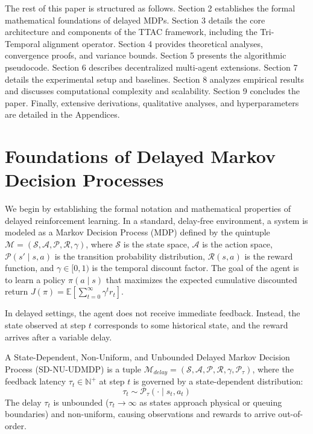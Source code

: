 \documentclass[manuscript, screen, review]{jair}
\begin{document}
The rest of this paper is structured as follows. Section 2 establishes the formal mathematical foundations of delayed MDPs. Section 3 details the core architecture and components of the TTAC framework, including the Tri-Temporal alignment operator. Section 4 provides theoretical analyses, convergence proofs, and variance bounds. Section 5 presents the algorithmic pseudocode. Section 6 describes decentralized multi-agent extensions. Section 7 details the experimental setup and baselines. Section 8 analyzes empirical results and discusses computational complexity and scalability. Section 9 concludes the paper. Finally, extensive derivations, qualitative analyses, and hyperparameters are detailed in the Appendices.

\section{Foundations of Delayed Markov Decision Processes}
We begin by establishing the formal notation and mathematical properties of delayed reinforcement learning. In a standard, delay-free environment, a system is modeled as a Markov Decision Process (MDP) defined by the quintuple $\mathcal{M} = (\mathcal{S}, \mathcal{A}, \mathcal{P}, \mathcal{R}, \gamma)$, where $\mathcal{S}$ is the state space, $\mathcal{A}$ is the action space, $\mathcal{P}(s' \mid s, a)$ is the transition probability distribution, $\mathcal{R}(s, a)$ is the reward function, and $\gamma \in [0, 1)$ is the temporal discount factor. The goal of the agent is to learn a policy $\pi(a \mid s)$ that maximizes the expected cumulative discounted return $J(\pi) = \mathbb{E} \left[ \sum_{t=0}^{\infty} \gamma^t r_t \right]$.

In delayed settings, the agent does not receive immediate feedback. Instead, the state observed at step $t$ corresponds to some historical state, and the reward arrives after a variable delay.

\begin{definition}
A State-Dependent, Non-Uniform, and Unbounded Delayed Markov Decision Process (SD-NU-UDMDP) is a tuple $\mathcal{M}_{delay} = (\mathcal{S}, \mathcal{A}, \mathcal{P}, \mathcal{R}, \gamma, \mathcal{P}_\tau)$, where the feedback latency $\tau_t \in \mathbb{N}^+$ at step $t$ is governed by a state-dependent distribution:
\begin{equation}
    \tau_t \sim \mathcal{P}_\tau(\cdot \mid s_t, a_t)
\end{equation}
The delay $\tau_t$ is unbounded ($\tau_t \to \infty$ as states approach physical or queuing boundaries) and non-uniform, causing observations and rewards to arrive out-of-order.
\end{definition}
\end{document}
